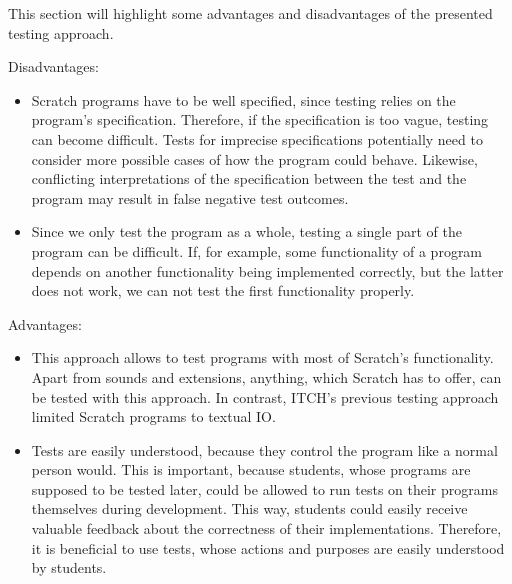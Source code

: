 This section will highlight some advantages and disadvantages of the presented testing approach.
\parspace


\noindent Disadvantages:

\begin{itemize}
    \item Scratch programs have to be well specified, since testing relies on the program's specification.
        Therefore, if the specification is too vague, testing can become difficult.
        Tests for imprecise specifications potentially need to consider more possible cases of how the program could behave.
        Likewise, conflicting interpretations of the specification between the test and the program may result in false negative test outcomes.
    \item Since we only test the program as a whole, testing a single part of the program can be difficult.
        If, for example, some functionality of a program depends on another functionality being implemented correctly,
        but the latter does not work, we can not test the first functionality properly.
\end{itemize}

\noindent Advantages:

\begin{itemize}
    \item This approach allows to test programs with most of Scratch's functionality.
        Apart from sounds and extensions, anything, which Scratch has to offer, can be tested with this approach.
        In contrast, ITCH's previous testing approach limited Scratch programs to textual IO.
    \item Tests are easily understood, because they control the program like a normal person would.
        This is important, because students, whose programs are supposed to be tested later,
        could be allowed to run tests on their programs themselves during development.
        This way, students could easily receive valuable feedback about the correctness of their implementations.
        Therefore, it is beneficial to use tests, whose actions and purposes are easily understood by students.
\end{itemize}










